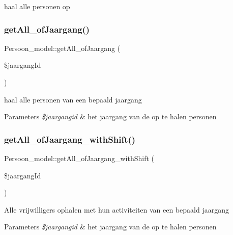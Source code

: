 haal alle personen op \mbox{\label{class_persoon__model_ad60023155e1b4bf3279227284647bc2d}} 
\subsubsection{\texorpdfstring{get\+All\+\_\+of\+Jaargang()}{getAll\_ofJaargang()}}
{\footnotesize\ttfamily Persoon\+\_\+model\+::get\+All\+\_\+of\+Jaargang (\begin{DoxyParamCaption}\item[{}]{\$jaargang\+Id }\end{DoxyParamCaption})}

haal alle personen van een bepaald jaargang 
\begin{DoxyParams}{Parameters}
{\em \$jaargangid} & het jaargang van de op te halen personen \\
\hline
\end{DoxyParams}
\mbox{\label{class_persoon__model_abe2394803431cfb447887c36bba2b8eb}} 
\subsubsection{\texorpdfstring{get\+All\+\_\+of\+Jaargang\+\_\+with\+Shift()}{getAll\_ofJaargang\_withShift()}}
{\footnotesize\ttfamily Persoon\+\_\+model\+::get\+All\+\_\+of\+Jaargang\+\_\+with\+Shift (\begin{DoxyParamCaption}\item[{}]{\$jaargang\+Id }\end{DoxyParamCaption})}

Alle vrijwilligers ophalen met hun activiteiten van een bepaald jaargang 
\begin{DoxyParams}{Parameters}
{\em \$jaargangid} & het jaargang van de op te halen personen \\
\hline
\end{DoxyParams}
\mbox{\label{class_persoon__model_a72d8c06b34d07ca558ec53c759996b60}} 
